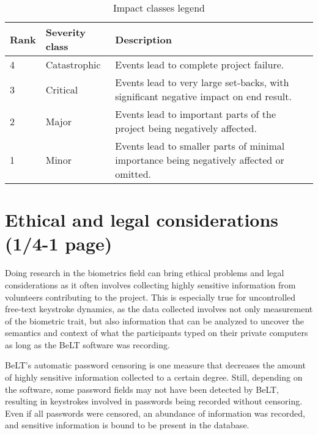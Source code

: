 \documentclass[informationsecurity]{gucmasterproject}
\begin{document}
\begin{table}[H]
\centering
\caption{Impact classes legend}
\label{tab:impact-classes}
\begin{tabular}{ p{2cm} p{3cm} p{8cm}}
\hline \bf Rank & \bf Severity class & \bf Description \\

\hline 4 & Catastrophic & Events lead to complete project failure. \\
3 & Critical & Events lead to very large set-backs, with significant negative impact on end result.\\
2 & Major & Events lead to important parts of the project being negatively affected. \\
1 & Minor & Events lead to smaller parts of minimal importance being negatively affected or omitted.\\
\hline
\end{tabular}
\end{table}





\chapter{Ethical and legal considerations (1/4-1 page)}
Doing research in the biometrics field can bring ethical problems and legal considerations as it often involves collecting highly sensitive information from volunteers contributing to the project.
This is especially true for uncontrolled free-text keystroke dynamics, as the data collected involves not only measurement of the biometric trait, but also information that can be analyzed to uncover the semantics and context of what the participants typed on their private computers as long as the BeLT software was recording.

BeLT's automatic password censoring is one measure that decreases the amount of highly sensitive information collected to a certain degree.
Still, depending on the software, some password fields may not have been detected by BeLT, resulting in keystrokes involved in passwords being recorded without censoring. 
Even if all passwords were censored, an abundance of information was recorded, and sensitive information is bound to be present in the database.
\end{document}
